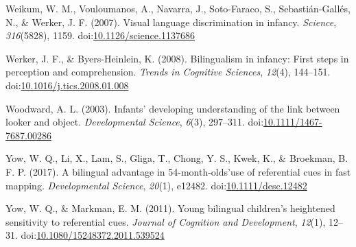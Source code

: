 \documentclass[,man,floatsintext]{apa6}
\begin{document}
\leavevmode\hypertarget{ref-Weikum_etal_2007}{}%
Weikum, W. M., Vouloumanos, A., Navarra, J., Soto-Faraco, S., Sebastián-Gallés, N., \& Werker, J. F. (2007). Visual language discrimination in infancy. \emph{Science}, \emph{316}(5828), 1159. doi:\href{https://doi.org/10.1126/science.1137686}{10.1126/science.1137686}

\leavevmode\hypertarget{ref-Werker_Byers-Heinlein_2008}{}%
Werker, J. F., \& Byers-Heinlein, K. (2008). Bilingualism in infancy: First steps in perception and comprehension. \emph{Trends in Cognitive Sciences}, \emph{12}(4), 144--151. doi:\href{https://doi.org/10.1016/j.tics.2008.01.008}{10.1016/j.tics.2008.01.008}

\leavevmode\hypertarget{ref-Woodward_2003}{}%
Woodward, A. L. (2003). Infants' developing understanding of the link between looker and object. \emph{Developmental Science}, \emph{6}(3), 297--311. doi:\href{https://doi.org/10.1111/1467-7687.00286}{10.1111/1467-7687.00286}

\leavevmode\hypertarget{ref-Yow_etal_2017}{}%
Yow, W. Q., Li, X., Lam, S., Gliga, T., Chong, Y. S., Kwek, K., \& Broekman, B. F. P. (2017). A bilingual advantage in 54-month-olds'use of referential cues in fast mapping. \emph{Developmental Science}, \emph{20}(1), e12482. doi:\href{https://doi.org/10.1111/desc.12482}{10.1111/desc.12482}

\leavevmode\hypertarget{ref-Yow_Markman_2011}{}%
Yow, W. Q., \& Markman, E. M. (2011). Young bilingual children's heightened sensitivity to referential cues. \emph{Journal of Cognition and Development}, \emph{12}(1), 12--31. doi:\href{https://doi.org/10.1080/15248372.2011.539524}{10.1080/15248372.2011.539524}

\endgroup
\end{document}
